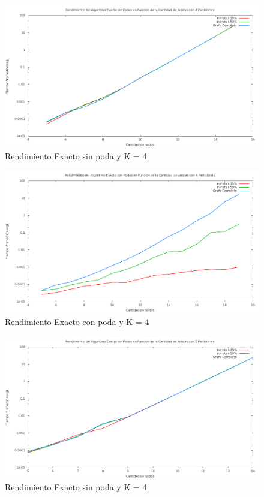 \begin{figure}[H]
\begin{center}
\includegraphics[scale=0.3]{finales/rendimientoExactoSinPoda4Particiones.png}
\caption{Rendimiento Exacto sin poda y K = 4}
\end{center}
\end{figure}

\begin{figure}[H]
\begin{center}
\includegraphics[scale=0.3]{finales/rendimientoExactoConPoda4Particiones.png}
\caption{Rendimiento Exacto con poda y K = 4}
\end{center}
\end{figure}

\begin{figure}[H]
\begin{center}
\includegraphics[scale=0.3]{finales/rendimientoExactoSinPoda5Particiones.png}
\caption{Rendimiento Exacto sin poda y K = 4}
\end{center}
\end{figure}

